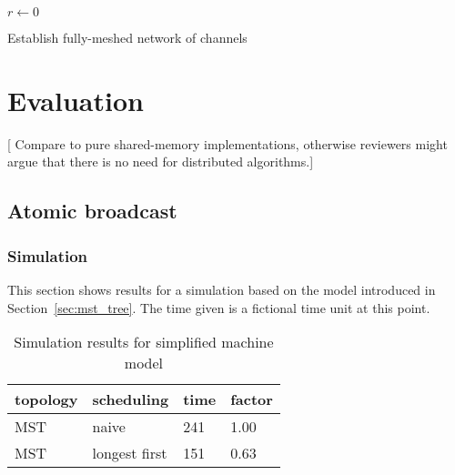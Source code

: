 \documentclass{article}
\newcommand{\stefan}[1]{
  {\color{skRed}[{\color{red}{SK}} #1]}}
\begin{document}
\begin{algorithm}[H]
  \BlankLine
  \BlankLine
  $r \leftarrow 0$\;
  \caption{Establish fully-meshed network of channels}
  \label{algo:ab_bind}
\end{algorithm}

\section{Evaluation}

\stefan{Compare to pure shared-memory implementations, otherwise
  reviewers might argue that there is no need for distributed
  algorithms.}

\subsection{Atomic broadcast}

\subsubsection{Simulation}

This section shows results for a simulation based on the model
introduced in Section~\ref{sec:mst_tree}. The time given is a
fictional time unit at this point.

\begin{table}[htb]
  \centering
  \begin{tabular}{llll}
    \toprule
    topology & scheduling & time & factor \\
    \midrule
    MST & naive         & 241 & 1.00 \\
    MST & longest first & 151 & 0.63 \\
    \bottomrule
  \end{tabular}
  \caption{Simulation results for simplified machine model}
  \label{tab:sim_results}
\end{table}
\end{document}
